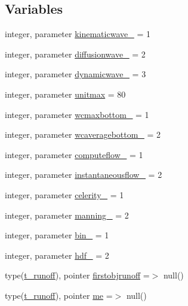 \subsection*{Variables}
\begin{DoxyCompactItemize}
\item 
integer, parameter \mbox{\hyperlink{namespacemodulerunoff_a7d872d73b43557b544361b9b74e90035}{kinematicwave\+\_\+}} = 1
\item 
integer, parameter \mbox{\hyperlink{namespacemodulerunoff_ac6fe68005bc73d532e27eb6517110958}{diffusionwave\+\_\+}} = 2
\item 
integer, parameter \mbox{\hyperlink{namespacemodulerunoff_a39f0eb1cba53c8d2b5c35a2bf91527c3}{dynamicwave\+\_\+}} = 3
\item 
integer, parameter \mbox{\hyperlink{namespacemodulerunoff_ac10e3a6d90722bfba74e163a0d843ca9}{unitmax}} = 80
\item 
integer, parameter \mbox{\hyperlink{namespacemodulerunoff_a7146fc045f78f9a09c70cf5d2ec8cb18}{wcmaxbottom\+\_\+}} = 1
\item 
integer, parameter \mbox{\hyperlink{namespacemodulerunoff_a11ce8a310aecc07c7ae3a6ebc63f67a3}{wcaveragebottom\+\_\+}} = 2
\item 
integer, parameter \mbox{\hyperlink{namespacemodulerunoff_af9e2c2870eb941ba39e12c7eaf792f73}{computeflow\+\_\+}} = 1
\item 
integer, parameter \mbox{\hyperlink{namespacemodulerunoff_afcb115128cbe159ab7b9ae036efd17e7}{instantaneousflow\+\_\+}} = 2
\item 
integer, parameter \mbox{\hyperlink{namespacemodulerunoff_a908cc460c8fa4ad1b256592fc1ee6f7a}{celerity\+\_\+}} = 1
\item 
integer, parameter \mbox{\hyperlink{namespacemodulerunoff_ab32f0149348946fb4056dcc3daad88b9}{manning\+\_\+}} = 2
\item 
integer, parameter \mbox{\hyperlink{namespacemodulerunoff_aba178d18c17a2ba6f92129edba6fa3a2}{bin\+\_\+}} = 1
\item 
integer, parameter \mbox{\hyperlink{namespacemodulerunoff_a513f6a75bd6e828db1c60af17f8017b4}{hdf\+\_\+}} = 2
\item 
type(\mbox{\hyperlink{structmodulerunoff_1_1t__runoff}{t\+\_\+runoff}}), pointer \mbox{\hyperlink{namespacemodulerunoff_abf39681d36c162ccb5230058a7271ef7}{firstobjrunoff}} =$>$ null()
\item 
type(\mbox{\hyperlink{structmodulerunoff_1_1t__runoff}{t\+\_\+runoff}}), pointer \mbox{\hyperlink{namespacemodulerunoff_a8cc2d0a24ef276099776dbfb529ab1bb}{me}} =$>$ null()
\end{DoxyCompactItemize}


